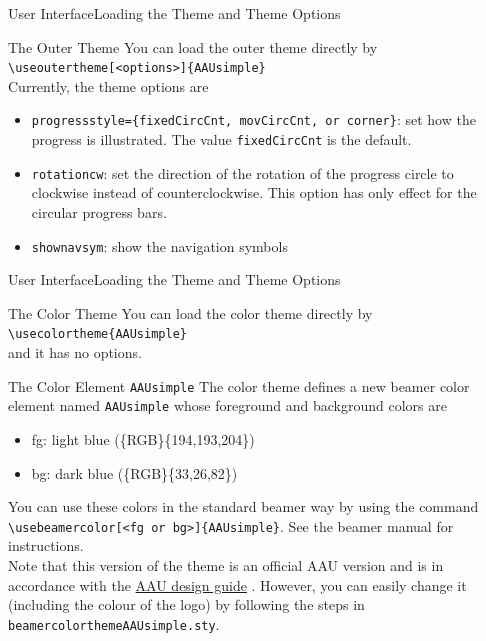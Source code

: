 \documentclass[10pt]{beamer}
\newcommand{\chref}[2]{%
  \href{#1}{{\usebeamercolor[bg]{AAUsimple}#2}}%
}
\begin{document}


\begin{frame}{User Interface}{Loading the Theme and Theme Options}
  \begin{block}{The Outer Theme}
    You can load the outer theme directly by\\
    {\tt \textbackslash useoutertheme[<options>]\{AAUsimple\}}\\
    Currently, the theme options are
  \begin{itemize}
    \item {\tt progressstyle=\{fixedCircCnt, movCircCnt, or corner\}}: set how the progress is illustrated. The value {\tt fixedCircCnt} is the default. 
    \item {\tt rotationcw}: set the direction of the rotation of the progress circle to clockwise instead of counterclockwise. This option has only effect for the circular progress bars.
    \item {\tt shownavsym}: show the navigation symbols
  \end{itemize}
  \end{block}
\end{frame}

\begin{frame}{User Interface}{Loading the Theme and Theme Options}
  \begin{block}{The Color Theme}
    You can load the color theme directly by\\
    {\tt \textbackslash usecolortheme\{AAUsimple\}}\\
    and it has no options.
  \end{block}
  \pause
  \begin{block}{The Color Element {\tt AAUsimple}}
    The color theme defines a new beamer color element named {\tt AAUsimple} whose foreground and background colors are
    \begin{itemize}
      \item fg: {light blue (\{RGB\}\{194,193,204\})}
      \item bg: {dark blue (\{RGB\}\{33,26,82\})}
    \end{itemize}
    You can use these colors in the standard beamer way by using the command
    {\tt \textbackslash usebeamercolor[<fg or bg>]\{AAUsimple\}}. See the beamer manual for instructions.\\
 \pause Note that this version of the theme is an official AAU version and is in accordance with the \chref{http://aau.designguides.dk/}{AAU design guide}. However, you can easily change it (including the colour of the logo) by following the steps in {\tt beamercolorthemeAAUsimple.sty}.
  \end{block}
\end{frame}
\end{document}
